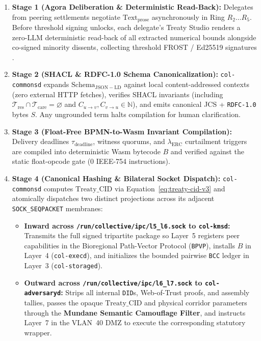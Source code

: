 \begin{enumerate}
  \item \textbf{Stage 1 (Agora Deliberation \& Deterministic Read-Back):} Delegates from peering settlements negotiate $\mathrm{Text}_{\mathrm{prose}}$ asynchronously in Ring $R_2 \dots R_5$. Before threshold signing unlocks, each delegate's Treaty Studio renders a zero-LLM deterministic read-back of all extracted numerical bounds alongside co-signed minority dissents, collecting threshold FROST / Ed25519 signatures \parencite{shamir1979}.
  \item \textbf{Stage 2 (SHACL \& RDFC-1.0 Schema Canonicalization):} \texttt{col-commonsd} expands $\mathrm{Schema}_{\mathrm{JSON-LD}}$ against local content-addressed contexts (zero external HTTP fetches), verifies SHACL invariants (including $\mathcal{T}_{\mathrm{res}} \cap \mathcal{T}_{\mathrm{care}} = \varnothing$ and $C_{u \to v}, C_{v \to u} \in \mathbb{N}$), and emits canonical JCS + \texttt{RDFC-1.0} bytes $S$. Any ungrounded term halts compilation for human clarification.
  \item \textbf{Stage 3 (Float-Free BPMN-to-Wasm Invariant Compilation):} Delivery deadlines $\tau_{\mathrm{deadline}}$, witness quorums, and $\lambda_{\mathrm{ERC}}$ curtailment triggers are compiled into deterministic Wasm bytecode $B$ and verified against the static float-opcode gate ($0$ IEEE-754 instructions).
  \item \textbf{Stage 4 (Canonical Hashing \& Bilateral Socket Dispatch):} \texttt{col-commonsd} computes $\mathrm{Treaty\_CID}$ via Equation~\eqref{eq:treaty-cid-v3} and atomically dispatches two distinct projections across its adjacent \texttt{SOCK\_SEQPACKET} membranes:
  \begin{itemize}
    \item \textbf{Inward across \texttt{/run/collective/ipc/l5\_l6.sock} to \texttt{col-kmsd}:} Transmits the full signed tripartite package so Layer~5 registers peer capabilities in the Bioregional Path-Vector Protocol (\texttt{BPVP}), installs $B$ in Layer~4 (\texttt{col-execd}), and initializes the bounded pairwise \texttt{BCC} ledger in Layer~3 (\texttt{col-storaged}).
    \item \textbf{Outward across \texttt{/run/collective/ipc/l6\_l7.sock} to \texttt{col-adversaryd}:} Strips all internal \texttt{DID}s, Web-of-Trust proofs, and assembly tallies, passes the opaque $\mathrm{Treaty\_CID}$ and physical corridor parameters through the \textbf{Mundane Semantic Camouflage Filter}, and instructs Layer~7 in the VLAN~40 DMZ to execute the corresponding statutory wrapper.
  \end{itemize}
\end{enumerate}


